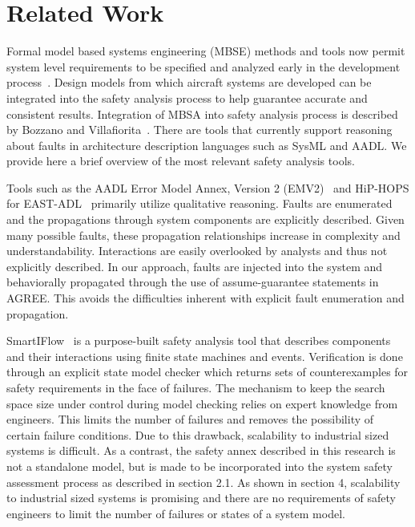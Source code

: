 \section{Related Work}
\label{sec:related_work}

Formal model based systems engineering (MBSE) methods and tools now permit system level requirements to be specified and analyzed early in the development process~\cite{QFCS15:backes,CIMATTI2015333, NFM2012:CoGaMiWhLaLu, hilt2013:MuWhRaHe}. Design models from which aircraft systems are developed can be integrated into the safety analysis process to help guarantee accurate and consistent results. Integration of MBSA into safety analysis process is described by Bozzano and Villafiorita~\cite{Bozzano:2010:DSA:1951720}. There are tools that currently support reasoning about faults in architecture description languages such as SysML and AADL. We provide here a brief overview of the most relevant safety analysis tools. 

Tools such as the AADL Error Model Annex, Version 2 (EMV2)~\cite{EMV2} and HiP-HOPS for EAST-ADL~\cite{CHEN201391} primarily utilize qualitative reasoning. Faults are enumerated and the propagations through system components are explicitly described. Given many possible faults, these propagation relationships increase in complexity and understandability. Interactions are easily overlooked by analysts and thus not explicitly described. In our approach, faults are injected into the system and behaviorally propagated through the use of assume-guarantee statements in AGREE. This avoids the difficulties inherent with explicit fault enumeration and propagation. 


SmartIFlow~\cite{info8010007} is a purpose-built safety analysis tool that describes components and their interactions using finite state machines and events. Verification is done through an explicit state model checker which returns sets of counterexamples for safety requirements in the face of failures. The mechanism to keep the search space size under control during model checking relies on expert knowledge from engineers. This limits the number of failures and removes the possibility of certain failure conditions. Due to this drawback, scalability to industrial sized systems is difficult. As a contrast, the safety annex described in this research is not a standalone model, but is made to be incorporated into the system safety assessment process as described in section 2.1. As shown in section 4, scalability to industrial sized systems is promising and there are no requirements of safety engineers to limit the number of failures or states of a system model. 

